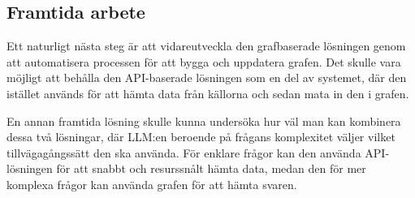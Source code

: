 \subsection{Framtida arbete}\label{subsec:future_work}

Ett naturligt nästa steg är att vidareutveckla den grafbaserade lösningen genom att automatisera processen för att bygga och uppdatera grafen.
Det skulle vara möjligt att behålla den API-baserade lösningen som en del av systemet, där den istället används för att hämta data från källorna och sedan mata in den i grafen.

En annan framtida lösning skulle kunna undersöka hur väl man kan kombinera dessa två lösningar, där LLM:en beroende på frågans komplexitet väljer vilket tillvägagångssätt den ska använda.
För enklare frågor kan den använda API-lösningen för att snabbt och resurssnålt hämta data, medan den för mer komplexa frågor kan använda grafen för att hämta svaren.



